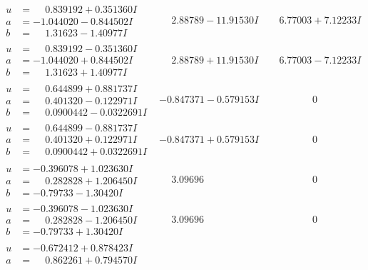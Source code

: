 \documentclass[1p]{elsarticle_modified}
\theoremstyle{definition}
\begin{document}
$$\begin{array}{c|c|c}
\begin{aligned}
u &= \phantom{-}0.839192 + 0.351360 I \\
a &= -1.044020 - 0.844502 I \\
b &= \phantom{-}1.31623 - 1.40977 I\end{aligned}
 & \phantom{-}2.88789 - 11.91530 I & \phantom{-}6.77003 + 7.12233 I \\ \hline\begin{aligned}
u &= \phantom{-}0.839192 - 0.351360 I \\
a &= -1.044020 + 0.844502 I \\
b &= \phantom{-}1.31623 + 1.40977 I\end{aligned}
 & \phantom{-}2.88789 + 11.91530 I & \phantom{-}6.77003 - 7.12233 I \\ \hline\begin{aligned}
u &= \phantom{-}0.644899 + 0.881737 I \\
a &= \phantom{-}0.401320 - 0.122971 I \\
b &= \phantom{-}0.0900442 - 0.0322691 I\end{aligned}
 & -0.847371 - 0.579153 I & \phantom{-0.000000 } 0 \\ \hline\begin{aligned}
u &= \phantom{-}0.644899 - 0.881737 I \\
a &= \phantom{-}0.401320 + 0.122971 I \\
b &= \phantom{-}0.0900442 + 0.0322691 I\end{aligned}
 & -0.847371 + 0.579153 I & \phantom{-0.000000 } 0 \\ \hline\begin{aligned}
u &= -0.396078 + 1.023630 I \\
a &= \phantom{-}0.282828 + 1.206450 I \\
b &= -0.79733 - 1.30420 I\end{aligned}
 & \phantom{-}3.09696\phantom{ +0.000000I} & \phantom{-0.000000 } 0 \\ \hline\begin{aligned}
u &= -0.396078 - 1.023630 I \\
a &= \phantom{-}0.282828 - 1.206450 I \\
b &= -0.79733 + 1.30420 I\end{aligned}
 & \phantom{-}3.09696\phantom{ +0.000000I} & \phantom{-0.000000 } 0 \\ \hline\begin{aligned}
u &= -0.672412 + 0.878423 I \\
a &= \phantom{-}0.862261 + 0.794570 I \\

\end{aligned}
\end{array}$$
\end{document}
